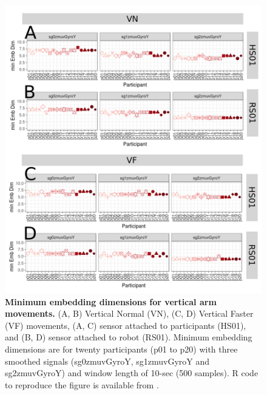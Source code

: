 \begin{figure}[!h]
\centering
\includegraphics[width=1.0\textwidth]{cao_aVw10}
	\caption{
	{\bf Minimum embedding dimensions for vertical arm movements.} 
		(A, B) Vertical Normal (VN), (C, D) Vertical Faster (VF) 
		movements,
		(A, C) sensor attached to participants (HS01), and		
		(B, D) sensor attached to robot (RS01).
		Minimum embedding dimensions are for twenty participants 
		(p01 to p20) with three smoothed signals (sg0zmuvGyroY, 
		sg1zmuvGyroY and sg2zmuvGyroY) 
		and window length of 10-sec (500 samples).
		R code to reproduce the figure is available 
		from \cite{hwum2018}.
        }
    \label{fig:caoV}
\end{figure}

